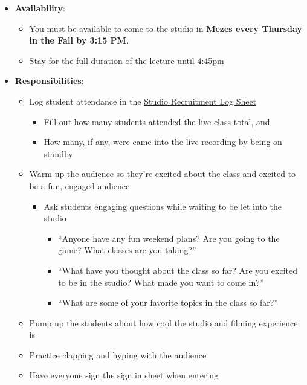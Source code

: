 \documentclass[
]{article}
\providecommand{\tightlist}{%
  \setlength{\itemsep}{0pt}\setlength{\parskip}{0pt}}
\begin{document}
\begin{itemize}
\tightlist
\item
  \textbf{Availability}:

  \begin{itemize}
  \tightlist
  \item
    You must be available to come to the studio in \textbf{Mezes every Thursday in the Fall by 3:15 PM}.
  \item
    Stay for the full duration of the lecture until 4:45pm
  \end{itemize}
\item
  \textbf{Responsibilities}:

  \begin{itemize}
  \tightlist
  \item
    Log student attendance in the \href{https://docs.google.com/spreadsheets/d/1c99r7PZXdpGsK9qJI7nqpL0r9CE9qULdytwzmRFdW9o/edit?usp=sharing}{Studio Recruitment Log Sheet}

    \begin{itemize}
    \tightlist
    \item
      Fill out how many students attended the live class total, and
    \item
      How many, if any, were came into the live recording by being on standby
    \end{itemize}
  \item
    Warm up the audience so they're excited about the class and excited to be a fun, engaged audience

    \begin{itemize}
    \tightlist
    \item
      Ask students engaging questions while waiting to be let into the studio

      \begin{itemize}
      \tightlist
      \item
        ``Anyone have any fun weekend plans? Are you going to the game? What classes are you taking?''
      \item
        ``What have you thought about the class so far? Are you excited to be in the studio? What made you want to come in?''
      \item
        ``What are some of your favorite topics in the class so far?''
      \end{itemize}
    \end{itemize}
  \item
    Pump up the students about how cool the studio and filming experience is
  \item
    Practice clapping and hyping with the audience
  \item
    Have everyone sign the sign in sheet when entering


\end{itemize}
\end{itemize}
\end{document}
